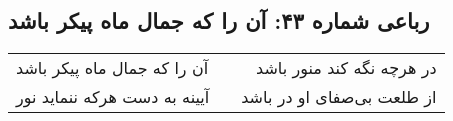 \begin{center}
\section*{رباعی شماره ۴۳: آن را که جمال ماه پیکر باشد}
\label{sec:043}
\begin{longtable}{l p{0.5cm} r}
آن را که جمال ماه پیکر باشد
&&
در هرچه نگه کند منور باشد
\\
آیینه به دست هرکه ننماید نور
&&
از طلعت بی‌صفای او در باشد
\\
\end{longtable}
\end{center}

